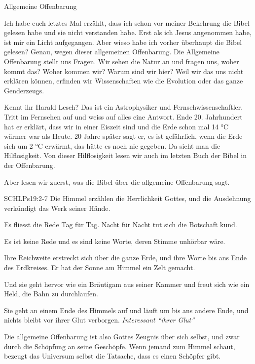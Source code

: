 \begin{otsblock}{Allgemeine Offenbarung}

    Ich habe euch letztes Mal erzählt, dass ich schon vor meiner Bekehrung die Bibel gelesen habe und sie nicht verstanden habe. Erst als ich Jesus angenommen habe, ist mir ein Licht aufgegangen. Aber wieso habe ich vorher überhaupt die Bibel gelesen? Genau, wegen dieser allgemeinen Offenbarung. Die Allgemeine Offenbarung stellt uns Fragen. Wir sehen die Natur an und fragen uns, woher kommt das? Woher kommen wir? Warum sind wir hier? Weil wir das uns nicht erklären können, erfinden wir Wissenschaften wie die Evolution oder das ganze Genderzeugs.

    Kennt ihr Harald Lesch? Das ist ein Astrophysiker und Fernsehwissenschaftler. Tritt im Fernsehen auf und weiss auf alles eine Antwort. Ende 20. Jahrhundert hat er erklärt, dass wir in einer Eiszeit sind und die Erde schon mal 14 °C wärmer war als Heute. 20 Jahre später sagt er, es ist gefährlich, wenn die Erde sich um 2 °C erwärmt, das hätte es noch  nie gegeben. Da sieht man die Hilflosigkeit. Von dieser Hilflosigkeit lesen wir auch im letzten Buch der Bibel in der Offenbarung.

    Aber lesen wir zuerst, was die Bibel über die allgemeine Offenbarung sagt.

    \begin{bibelbox}{SCHL}{Ps}{19:2-7}
        Die Himmel erzählen die Herrlichkeit Gottes, und die Ausdehnung verkündigt das Werk seiner Hände.

        Es fliesst die Rede Tag für Tag. Nacht für Nacht tut sich die Botschaft kund.

        Es ist keine Rede und es sind keine Worte, deren Stimme unhörbar wäre.

        Ihre Reichweite erstreckt sich über die ganze Erde, und ihre Worte bis ans Ende des Erdkreises. Er hat der Sonne am Himmel ein Zelt gemacht.

        Und sie geht hervor wie ein Bräutigam aus seiner Kammer und freut sich wie ein Held, die Bahn zu durchlaufen.

         Sie geht an einem Ende des Himmels auf und läuft um bis ans andere Ende, und nichts bleibt vor ihrer Glut verborgen.
        \textit{Interessant \enquote{ihrer Glut}}
    \end{bibelbox}
    Die allgemeine Offenbarung ist also Gottes Zeugnis über sich selbst, und zwar durch die Schöpfung an seine Geschöpfe. Wenn jemand zum Himmel schaut, bezeugt das Universum selbst die Tatsache, dass es einen Schöpfer gibt.


\end{otsblock}
